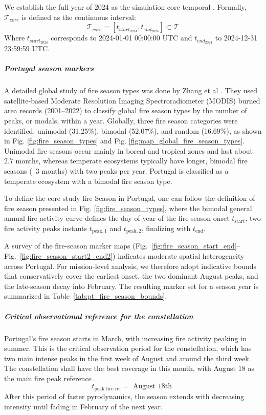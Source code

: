  We establish the full year of 2024 as the simulation core temporal  . Formally, $\mathcal{T}_{core}$ is defined as the continuous interval:
\begin{equation}
    \mathcal{T}_{core} = [t_{start_{2024}}, t_{end_{2024}}] \subset \mathcal{T}
\end{equation}
Where $t_{start_{2024}}$ corresponds to 2024-01-01 00:00:00 UTC and $t_{end_{2024}}$ to 2024-12-31 23:59:59 UTC.

\subparagraph{Portugal season markers}\hspace{0pt}

A detailed global study of fire season types was done by Zhang et al \cite{zhang_global_2025}. They used satellite-based Moderate Resolution Imaging Spectroradiometer (MODIS) burned area records (2001–2022) to classify global fire season types by the number of peaks, or modals, within a year. Globally, three fire season categories were identified: unimodal (31.25\%), bimodal (52.07\%), and random (16.69\%), as shown in Fig. \ref{fig:fire_season_types} and Fig. \ref{fig:map_global_fire_season_types}. Unimodal fire seasons occur mainly in boreal and tropical zones and last about 2.7 months, whereas temperate ecosystems typically have longer, bimodal fire seasons (~3 months) with two peaks per year. Portugal is classified as a temperate ecosystem with a bimodal fire season type.

To define the core study fire Season in Portugal, one can follow the definition of fire season presented in Fig. \ref{fig:fire_season_types}, where the bimodal general annual fire activity curve defines the day of year of the fire season onset $t_{\text{start}}$, two fire activity peaks instants $t_{\text{peak},1}$ and $t_{\text{peak},2}$,  finalizing with $t_{\text{end}}$. 

A survey of the fire-season marker maps (Fig.~\ref{fig:fire_season_start_end}--Fig.~\ref{fig:fire_season_start2_end2}) indicates moderate spatial heterogeneity across Portugal. For mission-level analysis, we therefore adopt indicative bounds that conservatively cover the earliest onset, the two dominant August peaks, and the late-season decay into February. The resulting marker set for a season year  is summarized in Table~\ref{tab:pt_fire_season_bounds}.

\subparagraph{Critical observational reference for the constellation}\hspace{0pt}

Portugal's fire season starts in March, with increasing fire activity peaking in summer. This is the critical observation period for the constellation, which has two main intense peaks in the first week of August and around the third week. The constellation shall have the best coverage in this month, with August 18 as the main fire peak reference . 
\begin{equation}
    t_{\text{peak fire ref}} = \text{ August 18th }
    \label{eq:peak_fire_ref_day}
\end{equation}
After this period of faster pyrodynamics, the season extends with decreasing intensity until fading in February of the next year. 



